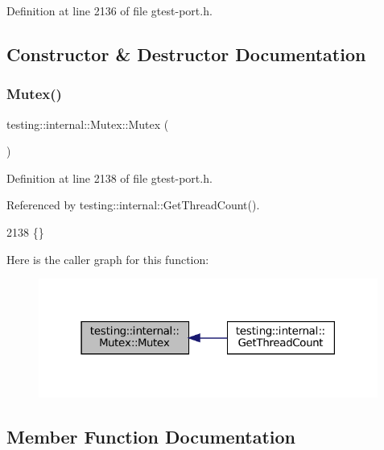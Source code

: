 Definition at line 2136 of file gtest-\/port.\+h.



\subsection{Constructor \& Destructor Documentation}
\mbox{\label{classtesting_1_1internal_1_1Mutex_a38e1833a78e3eec81ad23ce1b056b40e}} 
\subsubsection{\texorpdfstring{Mutex()}{Mutex()}}
{\footnotesize\ttfamily testing\+::internal\+::\+Mutex\+::\+Mutex (\begin{DoxyParamCaption}{ }\end{DoxyParamCaption})\hspace{0.3cm}{\ttfamily [inline]}}



Definition at line 2138 of file gtest-\/port.\+h.



Referenced by testing\+::internal\+::\+Get\+Thread\+Count().


\begin{DoxyCode}
2138 \{\}
\end{DoxyCode}
Here is the caller graph for this function\+:
\nopagebreak
\begin{figure}[H]
\begin{center}
\leavevmode
\includegraphics[width=316pt]{classtesting_1_1internal_1_1Mutex_a38e1833a78e3eec81ad23ce1b056b40e_icgraph}
\end{center}
\end{figure}


\subsection{Member Function Documentation}
\mbox{\label{classtesting_1_1internal_1_1Mutex_af45bf1660ac4110338a02a8680b2f486}} 
